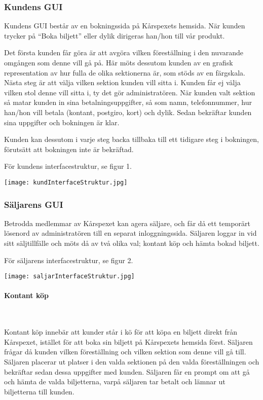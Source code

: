 \documentclass[a4paper, twoside, 11pt, titlepage]{article}
\begin{document}
		\subsubsection{Kundens GUI}


		Kundens GUI består av en bokningssida på Kårspexets hemsida. När kunden trycker på ``Boka biljett'' eller dylik dirigeras han/hon till vår produkt. 

		Det första kunden får göra är att avgöra vilken föreställning i den nuvarande omgången som denne vill gå på. Här möts dessutom kunden av en grafisk representation av hur fulla de olika sektionerna är, som stöds av en färgskala. Nästa steg är att välja vilken sektion kunden vill sitta i. Kunden får ej välja vilken stol denne vill sitta i, ty det gör administratören. När kunden valt sektion så matar kunden in sina betalningsuppgifter, så som namn, telefonnummer, hur han/hon vill betala (kontant, postgiro, kort) och dylik. Sedan bekräftar kunden sina uppgifter och bokningen är klar.

		Kunden kan dessutom i varje steg backa tillbaka till ett tidigare steg i bokningen, förutsätt att bokningen inte är bekräftad. 

		För kundens interfacestruktur, se figur 1.

		\texttt{[image: kundInterfaceStruktur.jpg]}

		\subsubsection{Säljarens GUI}


		Betrodda medlemmar av Kårspexet kan agera säljare, och får då ett temporärt lösenord av administratören till en separat inloggningssida. Säljaren loggar in vid sitt säljtillfälle och möts då av två olika val; kontant köp och hämta bokad biljett.

		För säljarens interfacestruktur, se figur 2.

		\texttt{[image: saljarInterfaceStruktur.jpg]}

			\paragraph{Kontant köp}\

			Kontant köp innebär att kunder står i kö för att köpa en biljett direkt från Kårspexet, istället för att boka sin biljett på Kårspexets hemsida först. Säljaren frågar då kunden vilken föreställning och vilken sektion som denne vill gå till. Säljaren placerar ut platser i den valda sektionen på den valda föreställningen och bekräftar sedan dessa uppgifter med kunden. Säljaren får en prompt om att gå och hämta de valda biljetterna, varpå säljaren tar betalt och lämnar ut biljetterna till kunden.
\end{document}
